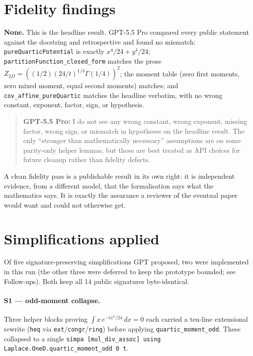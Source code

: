 \documentclass[11pt]{article}
\newcommand{\gptbox}[1]{\par\medskip\begin{quote}\small\textbf{\textcolor{green!50!black}{GPT-5.5 Pro:}} #1\end{quote}\medskip}
\begin{document}
\section{Fidelity findings}

\textbf{None.} This is the headline result. GPT-5.5 Pro compared every public
statement against the docstring and retrospective and found no mismatch:
\texttt{pureQuarticPotential} is exactly $x^4/24+y^4/24$;
\texttt{partitionFunction\_closed\_form} matches the prose
$Z_{2D}=((1/2)(24/t)^{1/4}\Gamma(1/4))^2$; the moment table (zero first moments,
zero mixed moment, equal second moments) matches; and \texttt{cov\_affine\_pureQuartic}
matches the headline verbatim, with no wrong constant, exponent, factor, sign, or
hypothesis.

\gptbox{I do not see any wrong constant, wrong exponent, missing factor, wrong
sign, or mismatch in hypotheses on the headline result. The only ``stronger than
mathematically necessary'' assumptions are on some parity-only helper lemmas, but
those are best treated as API choices for future cleanup rather than fidelity
defects.}

A clean fidelity pass is a publishable result in its own right: it is independent
evidence, from a different model, that the formalisation says what the mathematics
says. It is exactly the assurance a reviewer of the eventual paper would want and
could not otherwise get.

\section{Simplifications applied}

Of five signature-preserving simplifications GPT proposed, two were implemented in
this run (the other three were deferred to keep the prototype bounded; see
Follow-ups). Both keep all 14 public signatures byte-identical.

\paragraph{S1 --- odd-moment collapse.} Three helper blocks proving
$\int x\,e^{-tx^4/24}\,dx=0$ each carried a ten-line extensional rewrite
(\texttt{heq} via \texttt{ext}/\texttt{congr}/\texttt{ring}) before applying
\texttt{quartic\_moment\_odd}. These collapsed to a single
\texttt{simpa [mul\_div\_assoc] using Laplace.OneD.quartic\_moment\_odd 0 t}.
\end{document}

